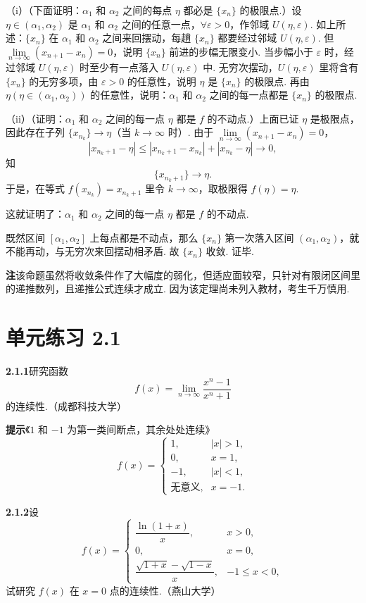 \documentclass[UTF8,12pt,a4paper,fontset=fandol]{ctexart}
\begin{document}
（i）（下面证明：$\alpha_1$ 和 $\alpha_2$ 之间的每点 $\eta$ 都必是 $\{x_n\}$ 的极限点.）设 $\eta\in(\alpha_1,\alpha_2)$ 是 $\alpha_1$ 和 $\alpha_2$ 之间的任意一点，$\forall\varepsilon>0$，作邻域 $U(\eta,\varepsilon)$. 如上所述：$\{x_n\}$ 在 $\alpha_1$ 和 $\alpha_2$ 之间来回摆动，每趟 $\{x_n\}$ 都要经过邻域 $U(\eta,\varepsilon)$. 但 $\lim\limits_{n\to\infty}(x_{n+1}-x_n)=0$，说明 $\{x_n\}$ 前进的步幅无限变小. 当步幅小于 $\varepsilon$ 时，经过邻域 $U(\eta,\varepsilon)$ 时至少有一点落入 $U(\eta,\varepsilon)$ 中. 无穷次摆动，$U(\eta,\varepsilon)$ 里将含有 $\{x_n\}$ 的无穷多项，由 $\varepsilon>0$ 的任意性，说明 $\eta$ 是 $\{x_n\}$ 的极限点. 再由 $\eta(\eta\in(\alpha_1,\alpha_2))$ 的任意性，说明：$\alpha_1$ 和 $\alpha_2$ 之间的每一点都是 $\{x_n\}$ 的极限点.

（ii）（证明：$\alpha_1$ 和 $\alpha_2$ 之间的每一点 $\eta$ 都是 $f$ 的不动点.）上面已证 $\eta$ 是极限点，因此存在子列 $\{x_{n_k}\}\to\eta$（当 $k\to\infty$ 时）. 由于 $\lim\limits_{n\to\infty}(x_{n+1}-x_n)=0$，
\[
  |x_{n_k+1}-\eta|\le |x_{n_k+1}-x_{n_k}|+|x_{n_k}-\eta|\to0,
\]
知
\[
  \{x_{n_k+1}\}\to\eta.
\]
于是，在等式 $f(x_{n_k})=x_{n_k+1}$ 里令 $k\to\infty$，取极限得 $f(\eta)=\eta$.

这就证明了：$\alpha_1$ 和 $\alpha_2$ 之间的每一点 $\eta$ 都是 $f$ 的不动点.

既然区间 $[\alpha_1,\alpha_2]$ 上每点都是不动点，那么 $\{x_n\}$ 第一次落入区间 $(\alpha_1,\alpha_2)$，就不能再动，与无穷次来回摆动相矛盾. 故 $\{x_n\}$ 收敛. 证毕.

\noindent\textbf{注}\quad 该命题虽然将收敛条件作了大幅度的弱化，但适应面较窄，只针对有限闭区间里的递推数列，且递推公式连续才成立. 因为该定理尚未列入教材，考生千万慎用.

\section*{单元练习 2.1}

\noindent\textbf{2.1.1}\quad 研究函数
\[
  f(x)=\lim_{n\to\infty}\frac{x^n-1}{x^n+1}
\]
的连续性.（成都科技大学）

\noindent\textbf{提示}\quad 《$1$ 和 $-1$ 为第一类间断点，其余处处连续》
\[
  f(x)=
  \begin{cases}
    1, & |x|>1,\\
    0, & x=1,\\
    -1, & |x|<1,\\
    \text{无意义}, & x=-1.
  \end{cases}
\]

\noindent\textbf{2.1.2}\quad 设
\[
  f(x)=
  \begin{cases}
    \dfrac{\ln(1+x)}{x}, & x>0,\\
    0, & x=0,\\
    \dfrac{\sqrt{1+x}-\sqrt{1-x}}{x}, & -1\le x<0,
  \end{cases}
\]
试研究 $f(x)$ 在 $x=0$ 点的连续性.（燕山大学）
\end{document}
